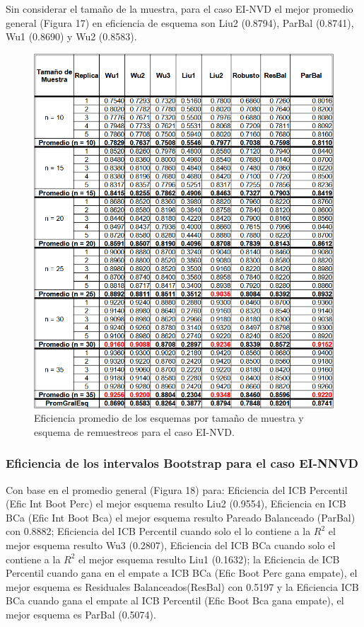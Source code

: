 Sin considerar el tamaño de la muestra, para el caso EI-NVD el mejor promedio general (Figura 17) en eficiencia de esquema son Liu2 (0.8794), ParBal (0.8741), Wu1 (0.8690) y Wu2 (0.8583).


\begin{figure}[ht] 
	\centering 
	\includegraphics[width=0.70\linewidth]{img/EI_NVD_Efic_Esq.png} 
	\caption{Eficiencia promedio de los esquemas por tamaño de muestra y esquema de remuestreos para el caso EI-NVD.} 
	\label{fig:EI_NVD_Esq}
\end{figure}
\FloatBarrier


\subsubsection{Eficiencia de los intervalos Bootstrap para el caso EI-NNVD}
Con base en el promedio general (Figura 18) para: Eficiencia del ICB Percentil (Efic Int Boot Perc) el mejor esquema resulto Liu2 (0.9554), Eficiencia en ICB BCa (Efic Int Boot Bca) el mejor esquema resulto Pareado Balanceado (ParBal) con 0.8882; Eficiencia del ICB Percentil cuando solo el lo contiene a la $R^{2}$ el mejor esquema resulto Wu3 (0.2807), Eficiencia del ICB BCa cuando solo el contiene a la $R^{2}$ el mejor esquema resulto Liu1 (0.1632); la Eficiencia de ICB Percentil cuando gana en el empate a ICB BCa (Efic Boot Perc gana empate), el mejor esquema es Residuales Balanceados(ResBal) con 0.5197 y la Eficiencia ICB BCa cuando gana el empate al ICB Percentil (Efic Boot Bca gana empate), el mejor esquema es ParBal (0.5074).
\vspace{.5cm}

